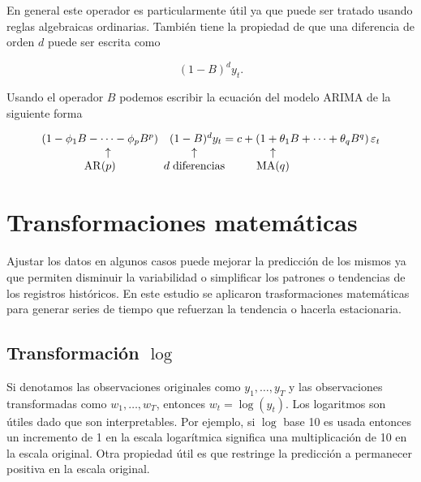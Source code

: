 En general este operador es particularmente útil ya que puede ser tratado usando reglas algebraicas ordinarias. También tiene la propiedad de que una diferencia de orden $d$ puede ser escrita como

\[
(1-B)^{d} y_{t}.
\]

Usando el operador $B$ podemos escribir la ecuación del modelo ARIMA de la siguiente forma

\begin{equation*}
	\begin{array}{ccc}
		\left(1-\phi_{1} B-\cdots-\phi_{p} B^{p}\right) & (1-B)^{d} y_{t}=c+\left(1+\theta_{1} B+\cdots+\theta_{q} B^{q}\right) \varepsilon_{t}\\
		\hspace{0.5cm}\uparrow & \hspace{-5cm}\uparrow & \hspace{-7cm}\uparrow \\
		\operatorname{AR}(p) & \hspace{-5cm}d\hspace{0.1cm}\text{diferencias} & \hspace{-7cm}\operatorname{MA}(q)
	\end{array}
\end{equation*}
\section{Transformaciones matemáticas}
\label{transformacionesmatematicas}
Ajustar los datos en algunos casos puede mejorar la predicción de los mismos ya que permiten disminuir la variabilidad o simplificar los patrones o tendencias de los registros históricos. En este estudio se aplicaron trasformaciones matemáticas para generar series de tiempo que refuerzan la tendencia o hacerla estacionaria.


\subsection{Transformación $\log$}

Si denotamos las observaciones originales como $y_{1}, \ldots, y_{T}$ y las observaciones transformadas como $w_{1}, \ldots, w_{T}$, entonces $w_{t}=\log \left(y_{t}\right)$. Los logaritmos son útiles dado que son interpretables. Por ejemplo, si $\log$ base 10 es usada entonces un incremento de 1 en la escala logarítmica significa una multiplicación de 10 en la escala original.  
Otra propiedad útil es que restringe la predicción a permanecer positiva en la escala original. 

